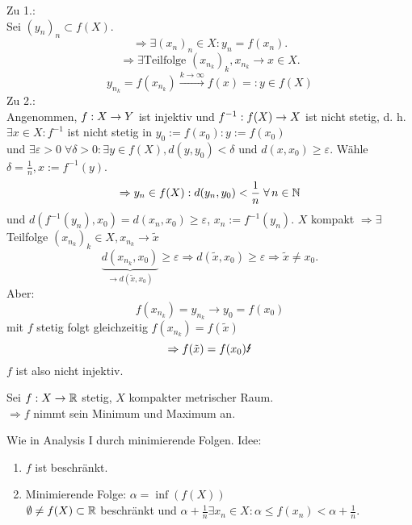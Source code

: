 \documentclass[../ana2.tex]{subfiles}
\begin{document}
\begin{bew}
    Zu 1.:\\
    Sei \( (y_n)_n \subset f(X) \).
    \[ \Rightarrow \exists (x_n)_n \in X: y_n = f(x_n). \]
    \[ \Rightarrow \exists \text{Teilfolge } 
    (x_{n_k})_k, x_{n_k} \rightarrow x \in X. \]
    \[ y_{n_k} = f(x_{n_k}) 
    \overset{k \rightarrow \infty}{\rightarrow} 
    f(x) =: y \in f(X) \]
    Zu 2.:\\
    Angenommen, \( f:X\rightarrow Y \) ist injektiv 
    und \( f^{-1}:f(X)\rightarrow X \) ist nicht stetig,
    d. h. \( \exists x \in X: f^{-1} \) ist nicht stetig in 
    \(y_0 := f(x_0): y := f(x_0)\) \\
    und \( \exists \varepsilon > 0 \; \forall \delta > 0: 
    \exists y \in f(X), d(y, y_0) < \delta \)
    und \( d(x, x_0) \geq \varepsilon \).
    Wähle \( \delta = \frac{1}{n}, x := f^{-1}(y) \).
    \[ \Rightarrow y_n \in f(X) : d(y_n, y_0) < \frac{1}{n} 
    \;\forall n\in\N \]
    und \( d(f^{-1}(y_n), x_0) = d(x_n, x_0) \geq \varepsilon \), 
    \( x_n := f^{-1}(y_n) \).
    \( X \) kompakt \(\Rightarrow \exists \) 
    Teilfolge \( (x_{n_k})_k \in X, x_{n_k} \rightarrow \tilde{x}\)  
    \[ \underbrace{d(x_{n_k}, x_0)}_{\rightarrow d(\tilde{x}, x_0)} 
    \geq \varepsilon 
    \Rightarrow d(\tilde{x}, x_0) \geq \varepsilon 
    \Rightarrow \tilde{x} \neq x_0. \]  
    Aber: 
    \[ f(x_{n_k}) = y_{n_k} \rightarrow y_0 = f(x_0) \]
    mit \(f\) stetig folgt gleichzeitig
    \( f(x_{n_k}) = f(\tilde{x}) \)
    \[ \Rightarrow f(\tilde{x}) = f(x_0) \text{\Lightning{}} \]
    \(f\) ist also nicht injektiv.
\end{bew}
\begin{satz}[Extrema]
    Sei \( f:X\rightarrow \mathbb{R} \) stetig, \( X \) kompakter 
    metrischer Raum.\\
    \( \Rightarrow f \) nimmt sein Minimum und 
    Maximum an.
\end{satz}
\begin{bew}
    Wie in Analysis I durch minimierende Folgen.
    Idee: 
    \begin{enumerate}
        \item \( f \) ist beschränkt.
        \item Minimierende Folge: \( \alpha = \inf(f(X)) \) \\
        \( \emptyset \neq f(X) \subset \mathbb{R} \) beschränkt und 
        \( \alpha + \frac{1}{n} \exists x_n \in X: 
        \alpha \leq f(x_n) < \alpha + \frac{1}{n} \).
    \end{enumerate}
\end{bew}
\end{document}
